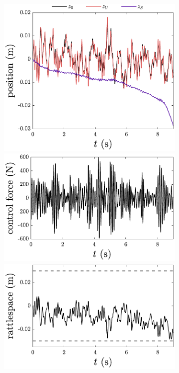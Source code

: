 \begin{figure}

\begin{subfigure}[b]{0.5\textwidth}
\centering
\includegraphics[width=\textwidth]{../ch8/figures/design2-position}
\includegraphics[width=\textwidth]{../ch8/figures/design2-control}
\includegraphics[width=\textwidth]{../ch8/figures/design2-rattlespace}

\end{subfigure}
\end{figure}
